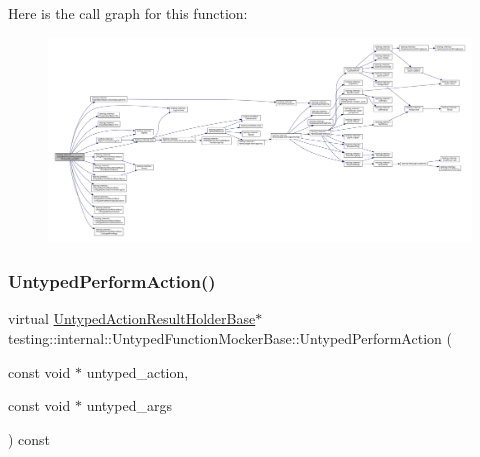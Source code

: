 Here is the call graph for this function\+:
\nopagebreak
\begin{figure}[H]
\begin{center}
\leavevmode
\includegraphics[width=350pt]{classtesting_1_1internal_1_1UntypedFunctionMockerBase_adaec41c0ba8a07c2415f6c8efa0ca54f_cgraph}
\end{center}
\end{figure}
\mbox{\label{classtesting_1_1internal_1_1UntypedFunctionMockerBase_ada5a72303863d0aa655b66338b8efea5}} 
\subsubsection{\texorpdfstring{Untyped\+Perform\+Action()}{UntypedPerformAction()}}
{\footnotesize\ttfamily virtual \hyperlink{classtesting_1_1internal_1_1UntypedActionResultHolderBase}{Untyped\+Action\+Result\+Holder\+Base}$\ast$ testing\+::internal\+::\+Untyped\+Function\+Mocker\+Base\+::\+Untyped\+Perform\+Action (\begin{DoxyParamCaption}\item[{const void $\ast$}]{untyped\+\_\+action,  }\item[{const void $\ast$}]{untyped\+\_\+args }\end{DoxyParamCaption}) const\hspace{0.3cm}{\ttfamily [pure virtual]}}



